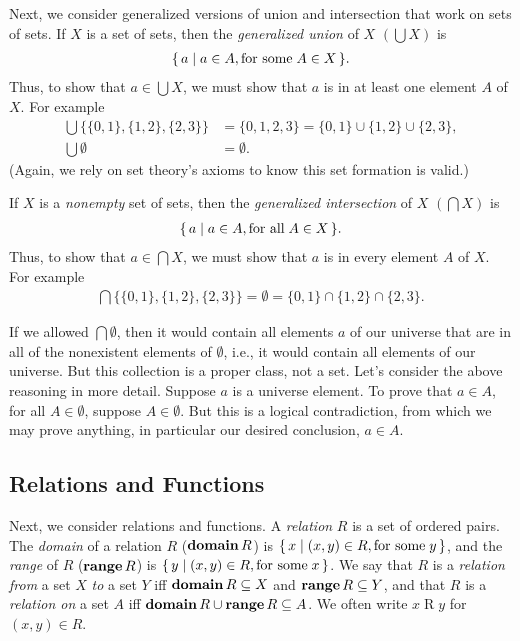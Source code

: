Next, we consider generalized versions of union and intersection that
work on sets of sets.  If $X$ is a set of sets, then the
\emph{generalized union}
%
%
of $X$ $(\bigcup X)$
%
%
is
\begin{gather*}
\{ \, a \mid a\in A,\allowbreak\mbox{for some}\allowbreak\;A\in X \, \} .
\end{gather*}
Thus, to show that $a\in\bigcup X$, we must show that $a$ is in at
least one element $A$ of $X$.  For example
\begin{align*}
\bigcup\{\{0,1\},\{1,2\},\{2,3\}\} &=
\{0,1,2,3\}=\{0,1\}\cup\{1,2\}\cup\{2,3\}, \\
\bigcup\emptyset &= \emptyset.
\end{align*}
(Again, we rely on set theory's axioms to know this set formation
is valid.)

If $X$ is a \emph{nonempty} set of sets, then the \emph{generalized
intersection}
%
%
of $X$ $(\bigcap X)$
%
%
is
\begin{gather*}
\{ \, a \mid a\in A,\allowbreak\mbox{for all}\allowbreak\;A\in X \, \} .
\end{gather*}
Thus, to show that $a\in\bigcap X$, we must show that
$a$ is in every element $A$ of $X$.
For example
\begin{gather*}
\bigcap\{\{0,1\},\{1,2\},\{2,3\}\} =
\emptyset=\{0,1\}\cap\{1,2\}\cap\{2,3\} .
\end{gather*}

If we allowed $\bigcap\emptyset$, then it would contain all elements
$a$ of our universe that are in all of the nonexistent elements of
$\emptyset$, i.e., it would contain all elements of our universe. But
this collection is a proper class, not a set. Let's consider the above
reasoning in more detail.  Suppose $a$ is a universe element. To prove
that $a\in A$, for all $A\in\emptyset$, suppose $A\in\emptyset$. But this is
a logical contradiction, from which we may prove anything, in particular our
%
desired conclusion, $a\in A$.

\subsection{Relations and Functions}

Next, we consider relations and functions.  A \emph{relation}
%
$R$ is a set of ordered pairs.  The \emph{domain}
%
%
of a relation $R$ ($\mathbf{domain}\,R$)
%
%
is $\{ \, x \mid (x,y)\in R, \allowbreak\mbox{for
some}\allowbreak\;y \, \}$, and the \emph{range}
%
%
of $R$ ($\mathbf{range}\,R$)
%
%
is $\{ \, y \mid (x,y)\in R,
\allowbreak\mbox{for some}\allowbreak\;x \, \}$.  We say that $R$ is a \emph{relation from} a
%
set $X$ \emph{to} a set $Y$ iff $\mathbf{domain}\,R\subseteq X$ and $\mathbf{range}\,R\subseteq Y$,
and that $R$ is a \emph{relation on} a set $A$ iff
$\mathbf{domain}\,R\cup\mathbf{range}\,R\subseteq A$.  We often write $x\mathrel{R}y$ for
$(x, y)\in R$.

